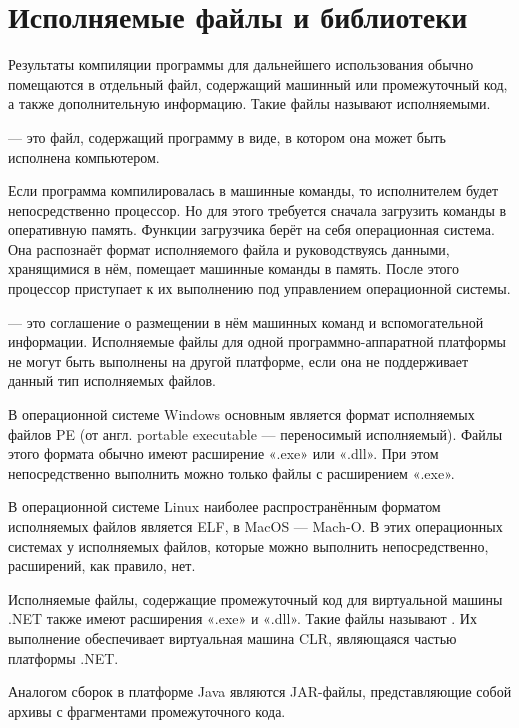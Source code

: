 \section{Исполняемые файлы и библиотеки}

Результаты компиляции программы для дальнейшего использования обычно
помещаются в отдельный файл, содержащий машинный или промежуточный
код, а также дополнительную информацию. Такие файлы называют
исполняемыми.

\begin{defn}
   — это файл, содержащий
  программу в виде, в котором она может быть исполнена компьютером.
\end{defn}

Если программа компилировалась в машинные команды, то исполнителем
будет непосредственно процессор. Но для этого требуется сначала
загрузить команды в оперативную память. Функции загрузчика берёт на
себя операционная система. Она распознаёт формат исполняемого файла и
руководствуясь данными, хранящимися в нём, помещает машинные команды в
память. После этого процессор приступает к их выполнению под
управлением операционной системы.

 — это
соглашение о размещении в нём машинных команд и вспомогательной
информации. Исполняемые файлы для одной программно-аппаратной
платформы не могут быть выполнены на другой платформе, если она не
поддерживает данный тип исполняемых файлов.

В операционной системе Windows основным является формат исполняемых
файлов PE (от англ. portable executable — переносимый
исполняемый). Файлы этого формата обычно имеют расширение «.exe» или
«.dll». При этом непосредственно выполнить можно только файлы с
расширением «.exe».

В операционной системе Linux наиболее распространённым форматом
исполняемых файлов является ELF, в MacOS — Mach-O. В этих операционных
системах у исполняемых файлов, которые можно выполнить
непосредственно, расширений, как правило, нет.

Исполняемые файлы, содержащие промежуточный код для виртуальной машины
.NET также имеют расширения «.exe» и «.dll». Такие файлы называют
. Их выполнение обеспечивает виртуальная
машина CLR, являющаяся частью платформы .NET.

Аналогом сборок в платформе Java являются JAR-файлы, представляющие
собой архивы с фрагментами промежуточного кода.

